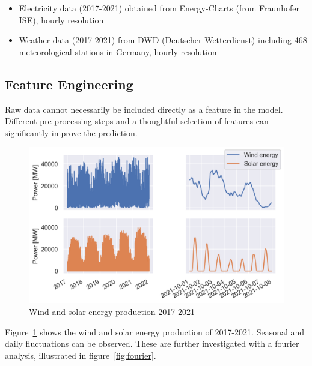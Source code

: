 \documentclass[11pt,table]{article}
\begin{document}
\begin{itemize}
  \item Electricity data (2017-2021) obtained from Energy-Charts (from Fraunhofer ISE), hourly resolution
  \item Weather data (2017-2021) from DWD (Deutscher Wetterdienst) including 468 meteorological stations in Germany, hourly resolution
\end{itemize}%

\subsection{Feature Engineering}
Raw data cannot necessarily be included directly as a feature in the model. Different pre-processing steps and a thoughtful selection of features can significantly improve the prediction. 
\begin{figure}[H]
	\centering
	\includegraphics[scale=0.9]{Figures/electrData.png}
	\caption{Wind and solar energy production 2017-2021}
	\label{fig:electrData}
\end{figure}
Figure~\ref{fig:electrData} shows the wind and solar energy production of 2017-2021. Seasonal and daily fluctuations can be observed. These are further investigated with a fourier analysis, illustrated in figure~\ref{fig:fourier}.
\end{document}

